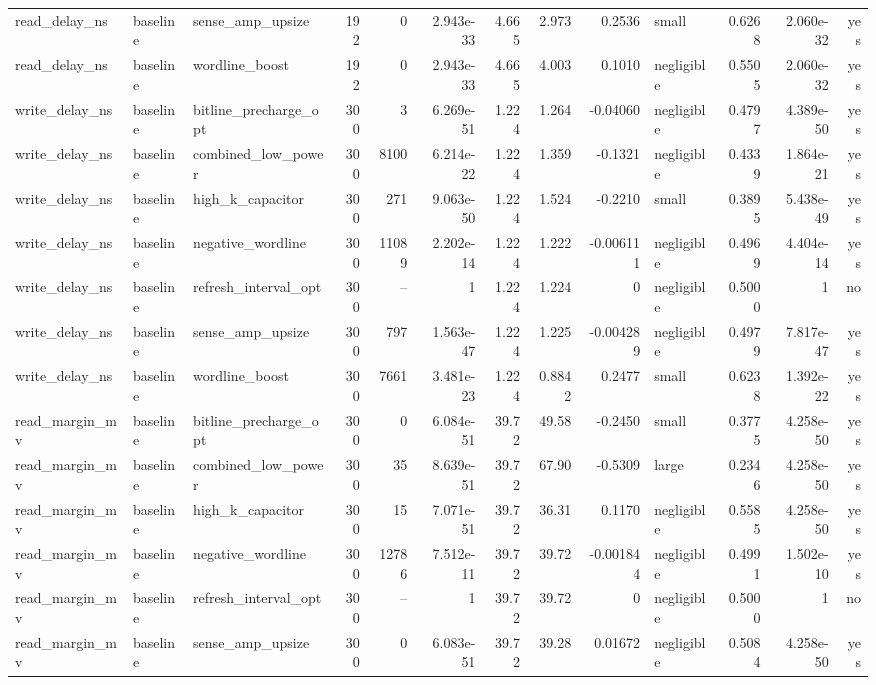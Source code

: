 \begin{table}[!t]
\begin{tabular}{lllrrrrrrlrrr}
read\_delay\_ns & baseline & sense\_amp\_upsize & 192 & 0 & 2.943e-33 & 4.665 & 2.973 & 0.2536 & small & 0.6268 & 2.060e-32 & yes \\
read\_delay\_ns & baseline & wordline\_boost & 192 & 0 & 2.943e-33 & 4.665 & 4.003 & 0.1010 & negligible & 0.5505 & 2.060e-32 & yes \\
write\_delay\_ns & baseline & bitline\_precharge\_opt & 300 & 3 & 6.269e-51 & 1.224 & 1.264 & -0.04060 & negligible & 0.4797 & 4.389e-50 & yes \\
write\_delay\_ns & baseline & combined\_low\_power & 300 & 8100 & 6.214e-22 & 1.224 & 1.359 & -0.1321 & negligible & 0.4339 & 1.864e-21 & yes \\
write\_delay\_ns & baseline & high\_k\_capacitor & 300 & 271 & 9.063e-50 & 1.224 & 1.524 & -0.2210 & small & 0.3895 & 5.438e-49 & yes \\
write\_delay\_ns & baseline & negative\_wordline & 300 & 11089 & 2.202e-14 & 1.224 & 1.222 & -0.006111 & negligible & 0.4969 & 4.404e-14 & yes \\
write\_delay\_ns & baseline & refresh\_interval\_opt & 300 & -- & 1 & 1.224 & 1.224 & 0 & negligible & 0.5000 & 1 & no \\
write\_delay\_ns & baseline & sense\_amp\_upsize & 300 & 797 & 1.563e-47 & 1.224 & 1.225 & -0.004289 & negligible & 0.4979 & 7.817e-47 & yes \\
write\_delay\_ns & baseline & wordline\_boost & 300 & 7661 & 3.481e-23 & 1.224 & 0.8842 & 0.2477 & small & 0.6238 & 1.392e-22 & yes \\
read\_margin\_mv & baseline & bitline\_precharge\_opt & 300 & 0 & 6.084e-51 & 39.72 & 49.58 & -0.2450 & small & 0.3775 & 4.258e-50 & yes \\
read\_margin\_mv & baseline & combined\_low\_power & 300 & 35 & 8.639e-51 & 39.72 & 67.90 & -0.5309 & large & 0.2346 & 4.258e-50 & yes \\
read\_margin\_mv & baseline & high\_k\_capacitor & 300 & 15 & 7.071e-51 & 39.72 & 36.31 & 0.1170 & negligible & 0.5585 & 4.258e-50 & yes \\
read\_margin\_mv & baseline & negative\_wordline & 300 & 12786 & 7.512e-11 & 39.72 & 39.72 & -0.001844 & negligible & 0.4991 & 1.502e-10 & yes \\
read\_margin\_mv & baseline & refresh\_interval\_opt & 300 & -- & 1 & 39.72 & 39.72 & 0 & negligible & 0.5000 & 1 & no \\
read\_margin\_mv & baseline & sense\_amp\_upsize & 300 & 0 & 6.083e-51 & 39.72 & 39.28 & 0.01672 & negligible & 0.5084 & 4.258e-50 & yes \\

\end{tabular}
\end{table}
